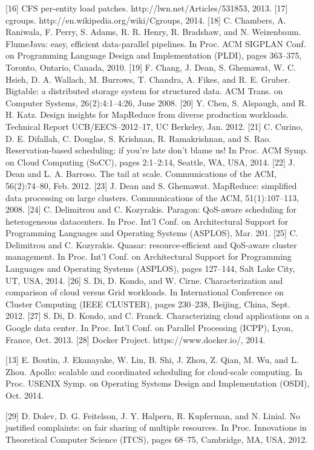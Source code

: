 [16] CFS per-entity load patches.
http://lwn.net/Articles/531853, 2013.
[17] cgroups. http://en.wikipedia.org/wiki/Cgroups,
2014.
[18] C. Chambers, A. Raniwala, F. Perry, S. Adams, R. R. Henry,
R. Bradshaw, and N. Weizenbaum. FlumeJava: easy, efficient
data-parallel pipelines. In Proc. ACM SIGPLAN Conf. on
Programming Language Design and Implementation (PLDI),
pages 363–375, Toronto, Ontario, Canada, 2010.
[19] F. Chang, J. Dean, S. Ghemawat, W. C. Hsieh, D. A.
Wallach, M. Burrows, T. Chandra, A. Fikes, and R. E.
Gruber. Bigtable: a distributed storage system for structured
data. ACM Trans. on Computer Systems, 26(2):4:1–4:26,
June 2008.
[20] Y. Chen, S. Alspaugh, and R. H. Katz. Design insights for
MapReduce from diverse production workloads. Technical
Report UCB/EECS–2012–17, UC Berkeley, Jan. 2012.
[21] C. Curino, D. E. Difallah, C. Douglas, S. Krishnan,
R. Ramakrishnan, and S. Rao. Reservation-based scheduling:
if you’re late don’t blame us! In Proc. ACM Symp. on Cloud
Computing (SoCC), pages 2:1–2:14, Seattle, WA, USA,
2014.
[22] J. Dean and L. A. Barroso. The tail at scale.
Communications of the ACM, 56(2):74–80, Feb. 2012.
[23] J. Dean and S. Ghemawat. MapReduce: simplified data
processing on large clusters. Communications of the ACM,
51(1):107–113, 2008.
[24] C. Delimitrou and C. Kozyrakis. Paragon: QoS-aware
scheduling for heterogeneous datacenters. In Proc. Int’l
Conf. on Architectural Support for Programming Languages
and Operating Systems (ASPLOS), Mar. 201.
[25] C. Delimitrou and C. Kozyrakis. Quasar: resource-efficient
and QoS-aware cluster management. In Proc. Int’l Conf. on
Architectural Support for Programming Languages and
Operating Systems (ASPLOS), pages 127–144, Salt Lake
City, UT, USA, 2014.
[26] S. Di, D. Kondo, and W. Cirne. Characterization and
comparison of cloud versus Grid workloads. In International
Conference on Cluster Computing (IEEE CLUSTER), pages
230–238, Beijing, China, Sept. 2012.
[27] S. Di, D. Kondo, and C. Franck. Characterizing cloud
applications on a Google data center. In Proc. Int’l Conf. on
Parallel Processing (ICPP), Lyon, France, Oct. 2013.
[28] Docker Project. https://www.docker.io/, 2014.

[13] E. Boutin, J. Ekanayake, W. Lin, B. Shi, J. Zhou, Z. Qian,
M. Wu, and L. Zhou. Apollo: scalable and coordinated
scheduling for cloud-scale computing. In Proc. USENIX
Symp. on Operating Systems Design and Implementation
(OSDI), Oct. 2014.

[29] D. Dolev, D. G. Feitelson, J. Y. Halpern, R. Kupferman, and
N. Linial. No justified complaints: on fair sharing of multiple
resources. In Proc. Innovations in Theoretical Computer
Science (ITCS), pages 68–75, Cambridge, MA, USA, 2012.

